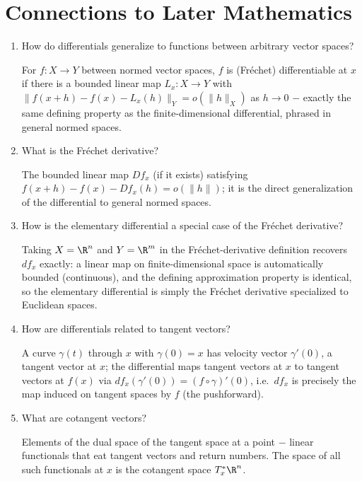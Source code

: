 \documentclass{self-check}
\begin{document}
\section{Connections to Later Mathematics}

\begin{enumerate}[resume, leftmargin=*, itemsep=8pt]
  \item How do differentials generalize to functions between arbitrary vector spaces?
    \begin{answer}
      For \(f:X\to Y\) between normed vector spaces, \(f\) is (Fr\'echet) differentiable at \(x\) if there is a bounded linear map \(L_{x}:X\to Y\) with \(\|f(x+h)-f(x)-L_{x}(h)\|_{Y}=o(\|h\|_{X})\) as \(h\to0\) \(-\) exactly the same defining property as the finite-dimensional differential, phrased in general normed spaces.
    \end{answer}
  \item What is the Fr\'echet derivative?
    \begin{answer}
      The bounded linear map \(Df_{x}\) (if it exists) satisfying \(f(x+h)-f(x)-Df_{x}(h)=o(\|h\|)\); it is the direct generalization of the differential to general normed spaces.
    \end{answer}
  \item How is the elementary differential a special case of the Fr\'echet derivative?
    \begin{answer}
      Taking \(X=\R^{n}\) and \(Y=\R^{m}\) in the Fr\'echet-derivative definition recovers \(df_{x}\) exactly: a linear map on finite-dimensional space is automatically bounded (continuous), and the defining approximation property is identical, so the elementary differential is simply the Fr\'echet derivative specialized to Euclidean spaces.
    \end{answer}
  \item How are differentials related to tangent vectors?
    \begin{answer}
      A curve \(\gamma(t)\) through \(x\) with \(\gamma(0)=x\) has velocity vector \(\gamma'(0)\), a tangent vector at \(x\); the differential maps tangent vectors at \(x\) to tangent vectors at \(f(x)\) via \(df_{x}(\gamma'(0))=(f\circ\gamma)'(0)\), i.e.\ \(df_{x}\) is precisely the map induced on tangent spaces by \(f\) (the pushforward).
    \end{answer}
  \item What are cotangent vectors?
    \begin{answer}
      Elements of the dual space of the tangent space at a point \(-\) linear functionals that eat tangent vectors and return numbers. The space of all such functionals at \(x\) is the cotangent space \(T_{x}^{*}\R^{n}\).

\end{answer}
\end{enumerate}
\end{document}

